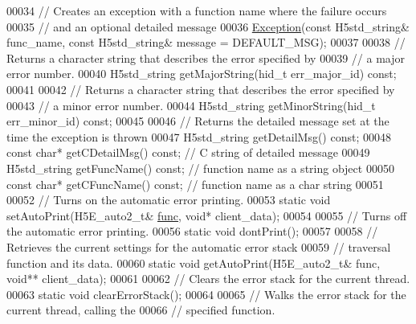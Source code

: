 \begin{DoxyCode}
00034         \textcolor{comment}{// Creates an exception with a function name where the failure occurs}
00035         \textcolor{comment}{// and an optional detailed message}
00036         \hyperlink{class_h5_1_1_exception}{Exception}(\textcolor{keyword}{const} H5std\_string& func\_name, \textcolor{keyword}{const} H5std\_string& message = DEFAULT\_MSG);
00037 
00038         \textcolor{comment}{// Returns a character string that describes the error specified by}
00039         \textcolor{comment}{// a major error number.}
00040         H5std\_string getMajorString(hid\_t err\_major\_id) \textcolor{keyword}{const};
00041 
00042         \textcolor{comment}{// Returns a character string that describes the error specified by}
00043         \textcolor{comment}{// a minor error number.}
00044         H5std\_string getMinorString(hid\_t err\_minor\_id) \textcolor{keyword}{const};
00045 
00046         \textcolor{comment}{// Returns the detailed message set at the time the exception is thrown}
00047         H5std\_string getDetailMsg() \textcolor{keyword}{const};
00048         \textcolor{keyword}{const} \textcolor{keywordtype}{char}* getCDetailMsg() \textcolor{keyword}{const};   \textcolor{comment}{// C string of detailed message}
00049         H5std\_string getFuncName() \textcolor{keyword}{const};    \textcolor{comment}{// function name as a string object}
00050         \textcolor{keyword}{const} \textcolor{keywordtype}{char}* getCFuncName() \textcolor{keyword}{const};    \textcolor{comment}{// function name as a char string}
00051 
00052         \textcolor{comment}{// Turns on the automatic error printing.}
00053         \textcolor{keyword}{static} \textcolor{keywordtype}{void} setAutoPrint(H5E\_auto2\_t& \hyperlink{structfunc}{func}, \textcolor{keywordtype}{void}* client\_data);
00054 
00055         \textcolor{comment}{// Turns off the automatic error printing.}
00056         \textcolor{keyword}{static} \textcolor{keywordtype}{void} dontPrint();
00057 
00058         \textcolor{comment}{// Retrieves the current settings for the automatic error stack}
00059         \textcolor{comment}{// traversal function and its data.}
00060         \textcolor{keyword}{static} \textcolor{keywordtype}{void} getAutoPrint(H5E\_auto2\_t& func, \textcolor{keywordtype}{void}** client\_data);
00061 
00062         \textcolor{comment}{// Clears the error stack for the current thread.}
00063         \textcolor{keyword}{static} \textcolor{keywordtype}{void} clearErrorStack();
00064 
00065         \textcolor{comment}{// Walks the error stack for the current thread, calling the}
00066         \textcolor{comment}{// specified function.}

\end{DoxyCode}
